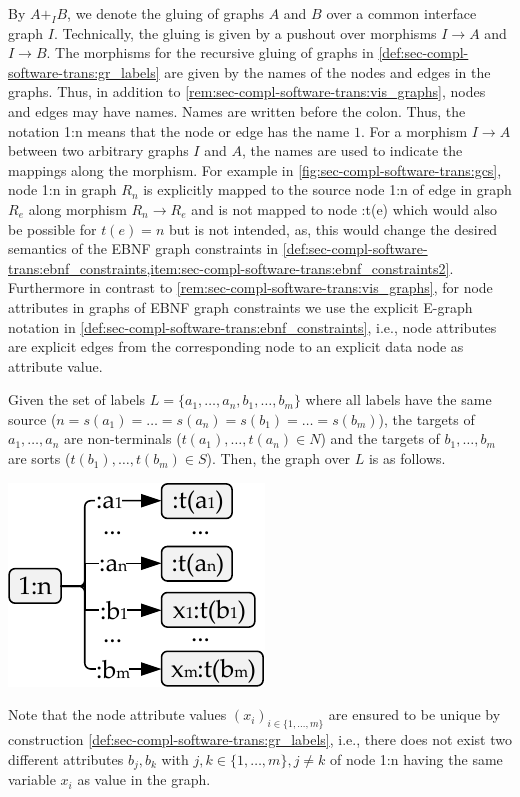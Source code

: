 \begin{remark}
By $A +_I B$, we denote the gluing of graphs $A$ and $B$ over a common interface graph $I$.
Technically, the gluing is given by a pushout over morphisms $I \to A$ and $I \to B$.
The morphisms for the recursive gluing of graphs in \cref{def:sec-compl-software-trans:gr_labels} are given by the names of the nodes and edges in the graphs.
Thus, in addition to \cref{rem:sec-compl-software-trans:vis_graphs}, nodes and edges may have names.
Names are written before the colon.
Thus, the notation \textsf{1:n} means that the node or edge has the name $1$.
For a morphism $I \to A$ between two arbitrary graphs $I$ and $A$, the names are used to indicate the mappings along the morphism.
For example in \cref{fig:sec-compl-software-trans:gcs}, node \textsf{1:n} in graph $R_n$ is explicitly mapped to the source node \textsf{1:n} of edge  in graph $R_e$ along morphism $R_n \to R_e$ and is not mapped to node \textsf{:t(e)} which would also be possible for $t(e)=n$ but is not intended, as, this would change the desired semantics of the EBNF graph constraints in \cref{def:sec-compl-software-trans:ebnf_constraints,item:sec-compl-software-trans:ebnf_constraints2}.
Furthermore in contrast to \cref{rem:sec-compl-software-trans:vis_graphs}, for node attributes in graphs of EBNF graph constraints we use the explicit E-graph notation in \cref{def:sec-compl-software-trans:ebnf_constraints}, i.e., node attributes are explicit edges from the corresponding node to an explicit data node as attribute value.
\envEndMarker
\end{remark}

\begin{example}
\label{ex:sec-compl-software-trans:graph_set_labels}
Given the set of labels $L=\{a_1,\ldots,a_n,b_1,\ldots,b_m\}$ where all labels have the same source ($n=s(a_1)=\ldots=s(a_n)=s(b_1)=\ldots=s(b_m)$), the targets of $a_1,\ldots,a_n$ are non-terminals ($t(a_1),\ldots,t(a_n) \in N$) and the targets of $b_1,\ldots,b_m$ are sorts ($t(b_1),\ldots,t(b_m) \in S$).
Then, the graph over $L$ is as follows.
\begin{center}
\includegraphics[width=.23\textwidth]{img/software_trans/gr_labels.pdf}
\end{center}
Note that the node attribute values $(x_i)_{i \in \{1,\ldots,m\}}$ are ensured to be unique by construction \cref{def:sec-compl-software-trans:gr_labels}, i.e., there does not exist two different attributes $b_j,b_k$ with $j,k \in \{1,\ldots,m\},j \neq k$ of node \textsf{1:n} having the same variable $x_i$ as value in the graph.
\envEndMarker
\end{example}

